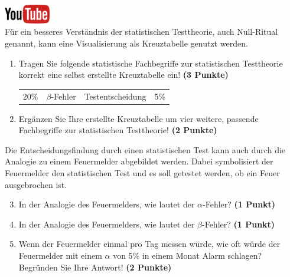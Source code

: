 \documentclass[a4paper, 9pt]{scrartcl}\usepackage[]{graphicx}\usepackage[]{xcolor}
\begin{document}
\hfill\href{https://youtu.be/Ric8ne39DtI}{\includegraphics[width =
  2cm]{img/youtube}}\\[1Ex]




F{\"u}r ein besseres Verst{\"a}ndnis der statistischen Testtheorie, auch
Null-Ritual genannt, kann eine Visualisierung als Kreuztabelle genutzt werden.  

\begin{enumerate}
\item Tragen Sie folgende statistische Fachbegriffe zur statistischen
  Testtheorie korrekt eine selbst erstellte Kreuztabelle ein! \textbf{(3
    Punkte)}
  \begin{center}
  \begin{tabular}{cccc}
  20\% & $\beta$-Fehler & Testentscheidung & 5\% \\
  \end{tabular}
  \end{center}
\item Erg{\"a}nzen Sie Ihre erstellte Kreuztabelle um vier weitere, passende
  Fachbegriffe zur statistischen Testtheorie! \textbf{(2 Punkte)}
\end{enumerate}

Die Entscheidungsfindung durch einen statistischen Test kann auch durch die
Analogie zu einem Feuermelder abgebildet werden. Dabei symbolisiert der
Feuermelder den statistischen Test und es soll getestet werden, ob ein Feuer
ausgebrochen ist.

\begin{enumerate}
  \setcounter{enumi}{2}    
\item In der Analogie des Feuermelders, wie lautet der $\alpha$-Fehler? \textbf{(1 Punkt)}
\item In der Analogie des Feuermelders, wie lautet der $\beta$-Fehler? \textbf{(1 Punkt)}
\item Wenn der Feuermelder einmal pro Tag messen w{\"u}rde, wie oft w{\"u}rde der
  Feuermelder mit einem $\alpha$ von 5\% in einem Monat Alarm schlagen?
  Begr{\"u}nden Sie Ihre Antwort! \textbf{(2 Punkte)}
\end{enumerate}



 
\clearpage
\end{document}
